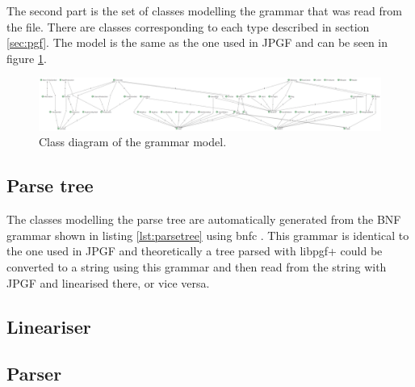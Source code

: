 The second part is the set of classes modelling the grammar that was read from the file. There are classes corresponding to each type described in section \ref{sec:pgf}. The model is the same as the one used in JPGF and can be seen in figure \ref{fig:grammarmodel}.

\begin{figure}[htb]
\centering
\includegraphics[width=\textheight,angle=90]{fig/grammarmodel}
\caption{Class diagram of the grammar model.}
\label{fig:grammarmodel}
\end{figure}


\subsection{Parse tree}
The classes modelling the parse tree are automatically generated from the BNF grammar shown in listing \ref{lst:parsetree} using bnfc \cite{bnfc}. This grammar is identical to the one used in JPGF and theoretically a tree parsed with libpgf+ could be converted to a string using this grammar and then read from the string with JPGF and linearised there, or vice versa.



\subsection{Lineariser}
\subsection{Parser}
